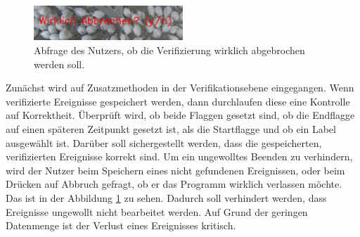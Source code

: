 \begin{figure}
    \begin{center}
        \vspace*{-9mm}
        \includegraphics[width=0.5\textwidth]{img/Verifikationstool/Verifikation Video mit Maske Abbruch Abfrage.png}
        \vspace*{-10mm}
        \caption{Abfrage des Nutzers, ob die Verifizierung wirklich abgebrochen werden soll.}
        \label{fig:VerifOverlAbbruch}
    \end{center}
\end{figure}
Zunächst wird auf Zusatzmethoden in der Verifikationsebene eingegangen. Wenn verifizierte Ereignisse gespeichert werden, dann durchlaufen diese eine Kontrolle auf Korrektheit. Überprüft wird, ob beide Flaggen gesetzt sind, ob die Endflagge auf einen späteren Zeitpunkt gesetzt ist, als die Startflagge und ob ein Label ausgewählt ist. Darüber soll sichergestellt werden, dass die gespeicherten, verifizierten Ereignisse korrekt sind. Um ein ungewolltes Beenden zu verhindern, wird der Nutzer beim  Speichern eines nicht gefundenen Ereignissen, oder beim Drücken auf Abbruch gefragt, ob er das Programm wirklich verlassen möchte. Das ist in der Abbildung \ref{fig:VerifOverlAbbruch} zu sehen. Dadurch soll verhindert werden, dass Ereignisse ungewollt nicht bearbeitet werden. Auf Grund der geringen Datenmenge ist der Verlust eines Ereignisses kritisch. \par

